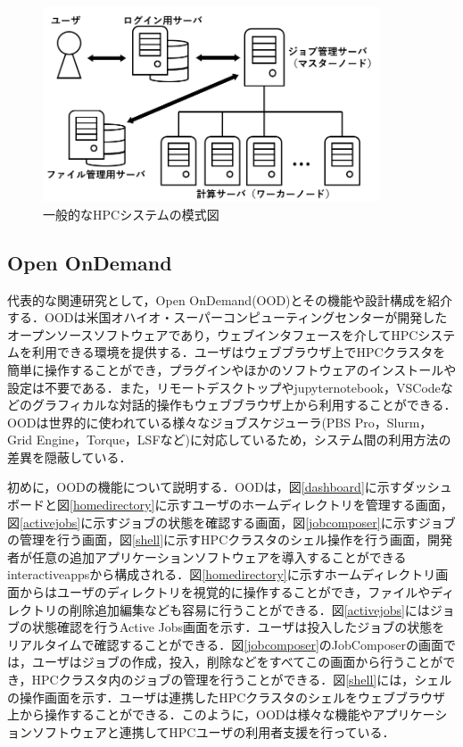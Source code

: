 \begin{figure}[tb]
    \centering
    \includegraphics[width=100mm]{./fig/HPCsystem.png}
    \caption{一般的なHPCシステムの模式図}
    \label{fig4}
\end{figure}


\subsection{Open OnDemand}
代表的な関連研究として，Open OnDemand(OOD)とその機能や設計構成を紹介する\cite{cite2}\cite{cite3}．OODは米国オハイオ・スーパーコンピューティングセンターが開発したオープンソースソフトウェアであり，ウェブインタフェースを介してHPCシステムを利用できる環境を提供する．ユーザはウェブブラウザ上でHPCクラスタを簡単に操作することができ，プラグインやほかのソフトウェアのインストールや設定は不要である．また，リモートデスクトップやjupyternotebook，VSCodeなどのグラフィカルな対話的操作もウェブブラウザ上から利用することができる．OODは世界的に使われている様々なジョブスケジューラ(PBS Pro，Slurm，Grid Engine，Torque，LSFなど)に対応しているため，システム間の利用方法の差異を隠蔽している．\par
初めに，OODの機能について説明する．OODは，図\ref{dashboard}に示すダッシュボードと図\ref{homedirectory}に示すユーザのホームディレクトリを管理する画面，図\ref{activejobs}に示すジョブの状態を確認する画面，図\ref{jobcomposer}に示すジョブの管理を行う画面，図\ref{shell}に示すHPCクラスタのシェル操作を行う画面，開発者が任意の追加アプリケーションソフトウェアを導入することができるinteractiveappsから構成される．図\ref{homedirectory}に示すホームディレクトリ画面からはユーザのディレクトリを視覚的に操作することができ，ファイルやディレクトリの削除追加編集なども容易に行うことができる．図\ref{activejobs}にはジョブの状態確認を行うActive Jobs画面を示す．ユーザは投入したジョブの状態をリアルタイムで確認することができる．図\ref{jobcomposer}のJobComposerの画面では，ユーザはジョブの作成，投入，削除などをすべてこの画面から行うことができ，HPCクラスタ内のジョブの管理を行うことができる．図\ref{shell}には，シェルの操作画面を示す．ユーザは連携したHPCクラスタのシェルをウェブブラウザ上から操作することができる．このように，OODは様々な機能やアプリケーションソフトウェアと連携してHPCユーザの利用者支援を行っている．\par
